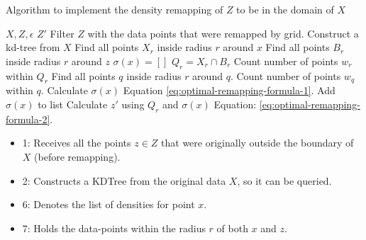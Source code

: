 \begin{algorithm}[H]
  \caption{Algorithm to implement the density remapping of $Z$ to be in the domain of $X$}
  \begin{algorithmic}[1]
    \Require $X, Z, \epsilon$                                
    \Ensure $Z'$
    \State Filter $Z$ with the data points that were remapped by grid.
    \State Construct a kd-tree from $X$
    \State Find all points $X_r$ inside radius $r$  around $x$ 
    \State Find all points $B_r$ inside radius $r$ around $z$
    \State $\sigma(x) = []$
    \State $Q_r = X_r \cap B_r$
    \State Count number of points $w_r$ within $Q_r$
    \State Find all points $q$ inside radius $r$ around $q$.
    \State Count number of points $w_q$ within $q$.
    \State Calculate $\sigma(x)$ \Comment Equation \ref{eq:optimal-remapping-formula-1}.
    \State Add $\sigma(x)$ to list
    \EndFor
    \State Calculate $z'$ using $Q_r$ and $\sigma(x)$ \Comment Equation: \ref{eq:optimal-remapping-formula-2}.
    \EndFor
  \end{algorithmic}
  \label{alg:optimal-remapping-laplace}
\end{algorithm}

\begin{itemize}
  \item 1: Receives all the points $z \in Z$ that were originally outside the boundary of $X$ (before remapping).
  \item 2: Constructs a KDTree from the original data $X$, so it can be queried.
  \item 6: Denotes the list of densities for point $x$.
  \item 7: Holds the data-points within the radius $r$ of both $x$ and $z$.
\end{itemize}

